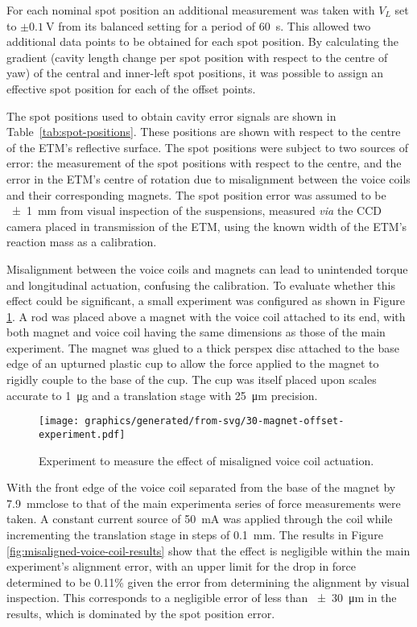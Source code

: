 For each nominal spot position an additional measurement was taken with $V_L$ set to $\pm \SI{0.1}{\volt}$ from its balanced setting for a period of \SI{60}{\second}. This allowed two additional data points to be obtained for each spot position. By calculating the gradient (cavity length change per spot position with respect to the centre of yaw) of the central and inner-left spot positions, it was possible to assign an effective spot position for each of the offset points.

The spot positions used to obtain cavity error signals are shown in Table~\ref{tab:spot-positions}. These positions are shown with respect to the centre of the \gls{ETM}'s reflective surface. The spot positions were subject to two sources of error: the measurement of the spot positions with respect to the centre, and the error in the \gls{ETM}'s centre of rotation due to misalignment between the voice coils and their corresponding magnets. The spot position error was assumed to be \SI{\pm1}{\milli\meter} from visual inspection of the suspensions, measured \emph{via} the CCD camera placed in transmission of the \gls{ETM}, using the known width of the \gls{ETM}'s reaction mass as a calibration.

Misalignment between the voice coils and magnets can lead to unintended torque and longitudinal actuation, confusing the calibration. To evaluate whether this effect could be significant, a small experiment was configured as shown in Figure\,\ref{fig:misaligned-voice-coil-experiment}. A rod was placed above a magnet with the voice coil attached to its end, with both magnet and voice coil having the same dimensions as those of the main experiment. The magnet was glued to a thick perspex disc attached to the base edge of an upturned plastic cup to allow the force applied to the magnet to rigidly couple to the base of the cup. The cup was itself placed upon scales accurate to \SI{1}{\micro\gram} and a translation stage with \SI{25}{\micro\meter} precision.

\begin{figure}
  \centering
  \texttt{[image: graphics/generated/from-svg/30-magnet-offset-experiment.pdf]}
  \caption{\label{fig:misaligned-voice-coil-experiment}Experiment to measure the effect of misaligned voice coil actuation.}
\end{figure}

With the front edge of the voice coil separated from the base of the magnet by \SI{7.9}{\milli\meter}\textemdash close to that of the main experiment\textemdash a series of force measurements were taken. A constant current source of \SI{50}{\milli\ampere} was applied through the coil while incrementing the translation stage in steps of \SI{0.1}{\milli\meter}. The results in Figure\,\ref{fig:misaligned-voice-coil-results} show that the effect is negligible within the main experiment's alignment error, with an upper limit for the drop in force determined to be \SI{0.11}{}\% given the error from determining the alignment by visual inspection. This corresponds to a negligible error of less than \SI{\pm30}{\micro\meter} in the results, which is dominated by the spot position error.

